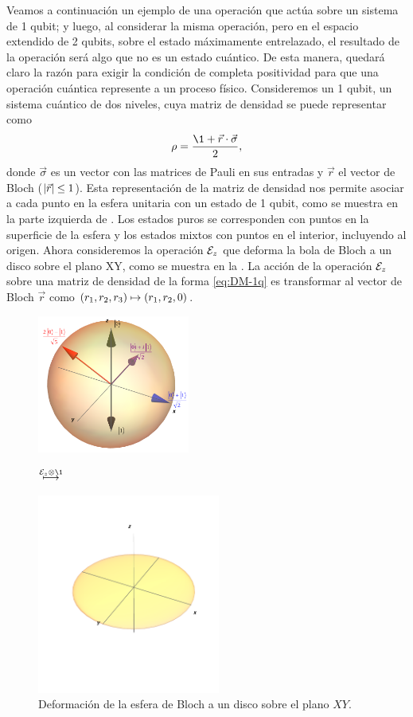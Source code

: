 Veamos a continuación un ejemplo de una operación que actúa sobre 
un sistema de 1 qubit; y luego, al considerar la misma operación, pero en 
el espacio extendido de 2 qubits, sobre
el estado máximamente entrelazado, 
el resultado de la operación será algo que no es un estado cuántico. 
De esta manera, quedará claro la razón para exigir la condición de 
completa positividad para que una operación cuántica 
represente a un proceso físico.
Consideremos un 1 qubit, un sistema cuántico
de dos niveles, cuya matriz de densidad se puede representar como
\cite{nielsen_chuang_2011}
\begin{align}
\rho=\frac{\1+\vec{r}\cdot\vec{\sigma}}{2},
\label{eq:DM-1q}
\end{align}
donde $\vec{\sigma}$ es un vector con las matrices de Pauli 
en sus entradas y $\vec{r}$
el vector de Bloch ($\abs{\vec{r}}\leq1$). Esta representación
de la matriz de densidad nos permite asociar a cada punto en la 
esfera unitaria con un estado de 1 qubit, como se muestra en la parte
izquierda de . Los estados puros se corresponden
con puntos en la superficie de la esfera y los estados mixtos 
con puntos en el interior, incluyendo al origen.
Ahora consideremos la operación $\mathcal{E}_z$ que deforma la bola de Bloch a un 
disco sobre el plano XY, como se muestra en la . 
La acción de la operación $\mathcal{E}_z$ sobre una matriz de densidad
de la forma \eqref{eq:DM-1q} es transformar al vector de Bloch $\vec{r}$
como $\qty(r_1,r_2,r_3)\mapsto\qty(r_1,r_2,0)$.
\begin{figure}[H]
\centering
\begin{minipage}{.4\textwidth}
\centering
\includegraphics[width=5cm]
{img-congreso/bloch.png}
\end{minipage}
$\stackrel{\E_{z}\otimes\1 \vspace{1cm}}{\longmapsto}$
\begin{minipage}{0.4\textwidth}
\centering
\includegraphics[width=6cm]
{img-congreso/DiskXY}
\end{minipage}
\caption{Deformación de la esfera de Bloch a un disco sobre el plano $XY$.}
\label{fig:qtm-op-motivation}
\end{figure}
